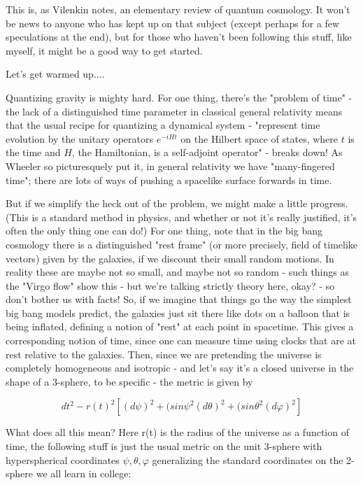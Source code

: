 

This is, as Vilenkin notes, an elementary review of quantum cosmology. It won't be news to anyone who has kept up on that subject (except perhaps for a few speculations at the end), but for those who haven't been following this stuff, like myself, it might be a good way to get started.

Let's get warmed up....

Quantizing gravity is mighty hard. For one thing, there's the "problem of time" - the lack of a distinguished time parameter in classical general relativity means that the usual recipe for quantizing a dynamical system - "represent time evolution by the unitary operators $e^{-iHt}$ on the Hilbert space of states, where $t$ is the time and $H$, the Hamiltonian, is a self-adjoint operator" - breaks down! As Wheeler so picturesquely put it, in general relativity we have "many-fingered time"; there are lots of ways of pushing a spacelike surface forwards in time.

But if we simplify the heck out of the problem, we might make a little progress. (This is a standard method in physics, and whether or not it's really justified, it's often the only thing one can do!) For one thing, note that in the big bang cosmology there is a distinguished "rest frame" (or more precisely, field of timelike vectors) given by the galaxies, if we discount their small random motions. In reality these are maybe not so small, and maybe not so random - such things as the "Virgo flow" show this - but we're talking strictly theory here, okay? - so don't bother us with facts! So, if we imagine that things go the way the simplest big bang models predict, the galaxies just sit there like dots on a balloon that is being inflated, defining a notion of "rest" at each point in spacetime. This gives a corresponding notion of time, since one can measure time using clocks that are at rest relative to the galaxies. Then, since we are pretending the universe is completely homogeneous and isotropic - and let's say it's a closed universe in the shape of a 3-sphere, to be specific - the metric is given by

\[dt^2 - r(t)^2[(d\psi)^2 + (sin\psi^2{(d\theta)^2 + (sin\theta^2 (d\varphi)^2}]\]

What does all this mean? Here r(t) is the radius of the universe as a function of time, the following stuff is just the usual metric on the unit 3-sphere with hyperspherical coordinates $\psi, \theta, \varphi$ generalizing the standard coordinates on the 2-sphere we all learn in college:


